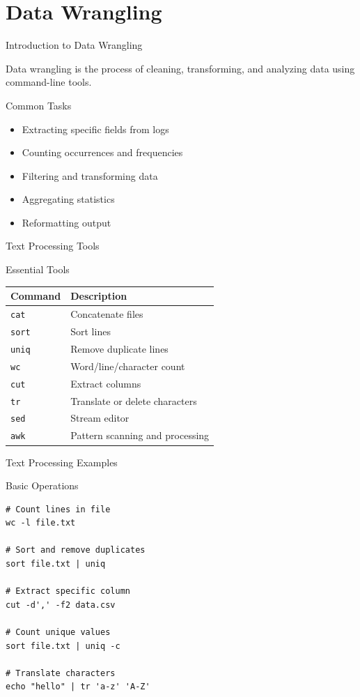 \documentclass[presentation,aspectratio=1610]{beamer}
\begin{document}
\section*{Data Wrangling}
\label{sec:org61fb4f1}

\begin{frame}[label={sec:org658a2a0}]{Introduction to Data Wrangling}
\begin{definition}\label{sec:org75f2f25}
Data wrangling is the process of cleaning, transforming, and analyzing data using command-line tools.
\end{definition}
\begin{block}{Common Tasks}
\begin{itemize}
\item Extracting specific fields from logs
\item Counting occurrences and frequencies
\item Filtering and transforming data
\item Aggregating statistics
\item Reformatting output
\end{itemize}
\end{block}
\end{frame}
\begin{frame}[label={sec:org2dda5ae},fragile]{Text Processing Tools}
 \begin{block}{Essential Tools}
\begin{center}
\begin{tabular}{ll}
Command & Description\\
\hline
\texttt{cat} & Concatenate files\\
\texttt{sort} & Sort lines\\
\texttt{uniq} & Remove duplicate lines\\
\texttt{wc} & Word/line/character count\\
\texttt{cut} & Extract columns\\
\texttt{tr} & Translate or delete characters\\
\texttt{sed} & Stream editor\\
\texttt{awk} & Pattern scanning and processing\\
\end{tabular}
\end{center}
\end{block}
\end{frame}
\begin{frame}[label={sec:orgc1957eb},fragile]{Text Processing Examples}
 \begin{block}{Basic Operations}
\begin{verbatim}
# Count lines in file
wc -l file.txt

# Sort and remove duplicates
sort file.txt | uniq

# Extract specific column
cut -d',' -f2 data.csv

# Count unique values
sort file.txt | uniq -c

# Translate characters
echo "hello" | tr 'a-z' 'A-Z'
\end{verbatim}
\end{block}
\end{frame}
\end{document}
